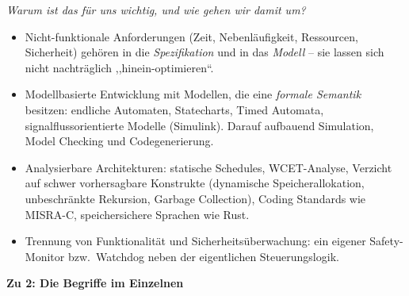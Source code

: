 \begin{loesung}
\emph{Warum ist das für uns wichtig, und wie gehen wir damit um?}
\begin{itemize}
    \item Nicht-funktionale Anforderungen (Zeit, Nebenläufigkeit, Ressourcen, Sicherheit) gehören in
          die \emph{Spezifikation} und in das \emph{Modell} -- sie lassen sich nicht nachträglich
          ,,hinein-optimieren``.
    \item Modellbasierte Entwicklung mit Modellen, die eine \emph{formale Semantik} besitzen:
          endliche Automaten, Statecharts, Timed Automata, signalflussorientierte Modelle
          (Simulink). Darauf aufbauend Simulation, Model Checking und Codegenerierung.
    \item Analysierbare Architekturen: statische Schedules, WCET-Analyse, Verzicht auf schwer
          vorhersagbare Konstrukte (dynamische Speicherallokation, unbeschränkte Rekursion,
          Garbage Collection), Coding Standards wie MISRA-C, speichersichere Sprachen wie Rust.
    \item Trennung von Funktionalität und Sicherheitsüberwachung: ein eigener Safety-Monitor bzw.\
          Watchdog neben der eigentlichen Steuerungslogik.
\end{itemize}

\textbf{Zu 2: Die Begriffe im Einzelnen}


\end{loesung}
